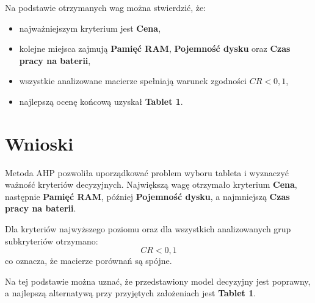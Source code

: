\documentclass[12pt,a4paper]{article}
\begin{document}
Na podstawie otrzymanych wag można stwierdzić, że:
\begin{itemize}
    \item najważniejszym kryterium jest \textbf{Cena},
    \item kolejne miejsca zajmują \textbf{Pamięć RAM}, \textbf{Pojemność dysku} oraz \textbf{Czas pracy na baterii},
    \item wszystkie analizowane macierze spełniają warunek zgodności \(CR<0{,}1\),
    \item najlepszą ocenę końcową uzyskał \textbf{Tablet 1}.
\end{itemize}

\section{Wnioski}

Metoda AHP pozwoliła uporządkować problem wyboru tableta i wyznaczyć ważność kryteriów decyzyjnych. Największą wagę otrzymało kryterium \textbf{Cena}, następnie \textbf{Pamięć RAM}, później \textbf{Pojemność dysku}, a najmniejszą \textbf{Czas pracy na baterii}.

Dla kryteriów najwyższego poziomu oraz dla wszystkich analizowanych grup subkryteriów otrzymano:
\[
CR<0{,}1
\]
co oznacza, że macierze porównań są spójne.

Na tej podstawie można uznać, że przedstawiony model decyzyjny jest poprawny, a najlepszą alternatywą przy przyjętych założeniach jest \textbf{Tablet 1}.
\end{document}
